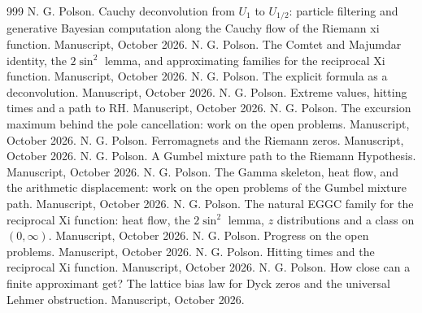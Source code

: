 \begin{thebibliography}{999}
 N. G. Polson. Cauchy deconvolution from $U_1$ to $U_{1/2}$: particle filtering and generative Bayesian computation along the Cauchy flow of the Riemann xi function. Manuscript, October 2026.
 N. G. Polson. The Comtet and Majumdar identity, the $2\sin^2$ lemma, and approximating families for the reciprocal Xi function. Manuscript, October 2026.
 N. G. Polson. The explicit formula as a deconvolution. Manuscript, October 2026.
 N. G. Polson. Extreme values, hitting times and a path to RH. Manuscript, October 2026.
 N. G. Polson. The excursion maximum behind the pole cancellation: work on the open problems. Manuscript, October 2026.
 N. G. Polson. Ferromagnets and the Riemann zeros. Manuscript, October 2026.
 N. G. Polson. A Gumbel mixture path to the Riemann Hypothesis. Manuscript, October 2026.
 N. G. Polson. The Gamma skeleton, heat flow, and the arithmetic displacement: work on the open problems of the Gumbel mixture path. Manuscript, October 2026.
 N. G. Polson. The natural EGGC family for the reciprocal Xi function: heat flow, the $2\sin^2$ lemma, $z$ distributions and a class on $(0,\infty)$. Manuscript, October 2026.
 N. G. Polson. Progress on the open problems. Manuscript, October 2026.
 N. G. Polson. Hitting times and the reciprocal Xi function. Manuscript, October 2026.
 N. G. Polson. How close can a finite approximant get? The lattice bias law for Dyck zeros and the universal Lehmer obstruction. Manuscript, October 2026.

\end{thebibliography}
